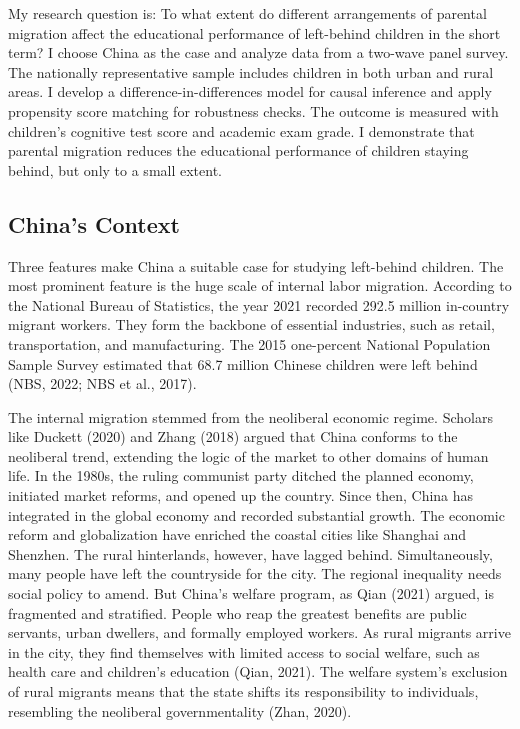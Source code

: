 \documentclass[
  man,floatsintext]{apa7}
\begin{document}
My research question is: To what extent do different arrangements of parental migration affect the educational performance of left-behind children in the short term? I choose China as the case and analyze data from a two-wave panel survey. The nationally representative sample includes children in both urban and rural areas. I develop a difference-in-differences model for causal inference and apply propensity score matching for robustness checks. The outcome is measured with children's cognitive test score and academic exam grade. I demonstrate that parental migration reduces the educational performance of children staying behind, but only to a small extent.

\hypertarget{chinas-context}{%
\subsection{China's Context}\label{chinas-context}}

Three features make China a suitable case for studying left-behind children. The most prominent feature is the huge scale of internal labor migration. According to the National Bureau of Statistics, the year 2021 recorded 292.5 million in-country migrant workers. They form the backbone of essential industries, such as retail, transportation, and manufacturing. The 2015 one-percent National Population Sample Survey estimated that 68.7 million Chinese children were left behind (NBS, 2022; NBS et al., 2017).

The internal migration stemmed from the neoliberal economic regime. Scholars like Duckett (2020) and Zhang (2018) argued that China conforms to the neoliberal trend, extending the logic of the market to other domains of human life. In the 1980s, the ruling communist party ditched the planned economy, initiated market reforms, and opened up the country. Since then, China has integrated in the global economy and recorded substantial growth. The economic reform and globalization have enriched the coastal cities like Shanghai and Shenzhen. The rural hinterlands, however, have lagged behind. Simultaneously, many people have left the countryside for the city. The regional inequality needs social policy to amend. But China's welfare program, as Qian (2021) argued, is fragmented and stratified. People who reap the greatest benefits are public servants, urban dwellers, and formally employed workers. As rural migrants arrive in the city, they find themselves with limited access to social welfare, such as health care and children's education (Qian, 2021). The welfare system's exclusion of rural migrants means that the state shifts its responsibility to individuals, resembling the neoliberal governmentality (Zhan, 2020).
\end{document}
